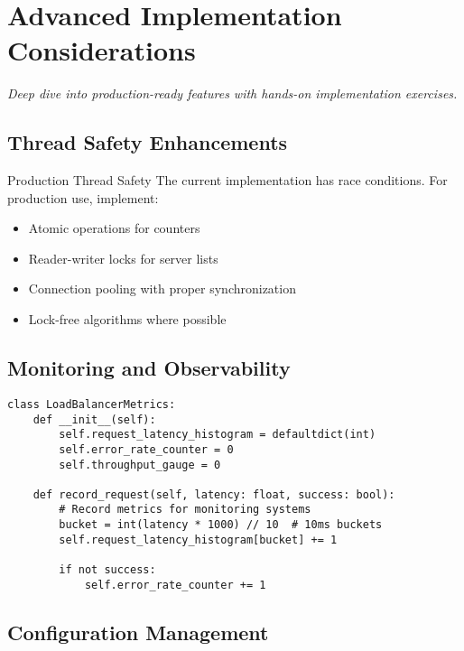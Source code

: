 \documentclass[12pt,a4paper]{article}
\begin{document}
\section{Advanced Implementation Considerations}
\label{sec:advanced}

\textit{Deep dive into production-ready features with hands-on implementation exercises.}

\subsection{Thread Safety Enhancements}
\label{subsec:threadsafety}

\begin{warningbox}{Production Thread Safety}
The current implementation has race conditions. For production use, implement:
\begin{itemize}
    \item Atomic operations for counters
    \item Reader-writer locks for server lists
    \item Connection pooling with proper synchronization
    \item Lock-free algorithms where possible
\end{itemize}
\end{warningbox}

\subsection{Monitoring and Observability}

\begin{lstlisting}[caption=Enhanced Monitoring]
class LoadBalancerMetrics:
    def __init__(self):
        self.request_latency_histogram = defaultdict(int)
        self.error_rate_counter = 0
        self.throughput_gauge = 0
        
    def record_request(self, latency: float, success: bool):
        # Record metrics for monitoring systems
        bucket = int(latency * 1000) // 10  # 10ms buckets
        self.request_latency_histogram[bucket] += 1
        
        if not success:
            self.error_rate_counter += 1
\end{lstlisting}

\subsection{Configuration Management}
\end{document}
